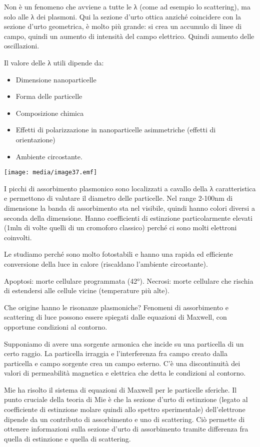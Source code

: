 Non è un fenomeno che avviene a tutte le λ (come ad esempio lo
scattering), ma solo alle λ dei plasmoni. Qui la sezione d'urto ottica
anziché coincidere con la sezione d'urto geometrica, è molto più grande:
si crea un accumulo di linee di campo, quindi un aumento di intensità
del campo elettrico. Quindi aumento delle oscillazioni.

Il valore delle λ utili dipende da:

\begin{itemize}
\item
  Dimensione nanoparticelle
\item
  Forma delle particelle
\item
  Composizione chimica
\item
  Effetti di polarizzazione in nanoparticelle asimmetriche (effetti di
  orientazione)
\item
  Ambiente circostante.
\end{itemize}

\texttt{[image: media/image37.emf]}

I picchi di assorbimento plasmonico sono localizzati a cavallo della λ
caratteristica e permettono di valutare il diametro delle particelle.
Nel range 2-100nm di dimensione la banda di assorbimento sta nel
visibile, quindi hanno colori diversi a seconda della dimensione. Hanno
coefficienti di estinzione particolarmente elevati (1mln di volte quelli
di un cromoforo classico) perché ci sono molti elettroni coinvolti.

Le studiamo perché sono molto fotostabili e hanno una rapida ed
efficiente conversione della luce in calore (riscaldano l'ambiente
circostante).

Apoptosi: morte cellulare programmata (42°). Necrosi: morte cellulare
che rischia di estendersi alle cellule vicine (temperature più alte).

Che origine hanno le risonanze plasmoniche? Fenomeni di assorbimento e
scattering di luce possono essere spiegati dalle equazioni di Maxwell,
con opportune condizioni al contorno.

Supponiamo di avere una sorgente armonica che incide su una particella
di un certo raggio. La particella irraggia e l'interferenza fra campo
creato dalla particella e campo sorgente crea un campo esterno. C'è una
discontinuità dei valori di permeabilità magnetica e elettrica che detta
le condizioni al contorno.

Mie ha risolto il sistema di equazioni di Maxwell per le particelle
sferiche. Il punto cruciale della teoria di Mie è che la sezione d'urto
di estinzione (legato al coefficiente di estinzione molare quindi allo
spettro sperimentale) dell'elettrone dipende da un contributo di
assorbimento e uno di scattering. Ciò permette di ottenere informazioni
sulla sezione d'urto di assorbimento tramite differenza fra quella di
estinzione e quella di scattering.

